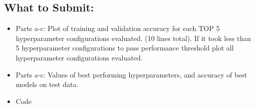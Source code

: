\documentclass{article}
\begin{document}
\begin{bprob}
\subsection*{What to Submit:}
\begin{itemize}
    \item Parts a-c: Plot of training and validation accuracy for each TOP 5 hyperparameter configurations evaluated. (10 lines total). If it took less than 5 hyperparameter configurations to pass performance threshold plot all hyperparameter configurations evaluated.
    \item Parts a-c: Values of best performing hyperparameters, and accuracy of best models on test data.
    \item Code
\end{itemize}
\end{bprob}
\end{document}
